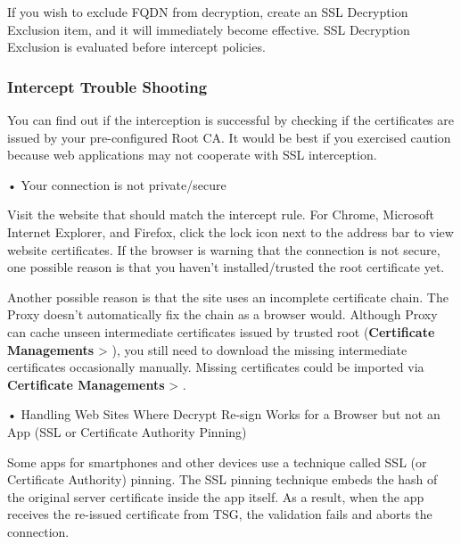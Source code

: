 If you wish to exclude FQDN from decryption, create an SSL Decryption Exclusion item, and it will immediately become effective. 
SSL Decryption Exclusion is evaluated before intercept policies.

\subsubsection*{\hypertarget{link:Intercept Trouble Shooting}{Intercept Trouble Shooting}}
\label{sec:policies:security:intercept:troubleshooting}

You can find out if the interception is successful by checking if the certificates are issued by your pre-configured Root CA. 
It would be best if you exercised caution because web applications may not cooperate with SSL interception.


• Your connection is not private/secure


Visit the website that should match the intercept rule. For Chrome, Microsoft Internet Explorer, and Firefox, click the lock icon next to the address bar to view website certificates. 
If the browser is warning that the connection is not secure, one possible reason is that you haven’t installed/trusted the root certificate yet. 


Another possible reason is that the site uses an incomplete certificate chain. The Proxy doesn’t automatically fix the chain as a browser would. 
Although Proxy can cache unseen intermediate certificates issued 
by trusted root (\textbf{Certificate Managements} > \textbf{\hyperlink{link:Cached Intermediate Certificates}{\color{linkblue}{Cached Intermediate Certificates}}}), 
you still need to download the missing intermediate certificates occasionally manually. 
Missing certificates could be imported via \textbf{Certificate Managements} > \textbf{\hyperlink{link:Trusted Certificate Authorities}{\color{linkblue}{Trusted Certificate Authorities}}}.


• Handling Web Sites Where Decrypt Re-sign Works for a Browser but not an App (SSL or Certificate Authority Pinning)


Some apps for smartphones and other devices use a technique called SSL (or Certificate Authority) pinning. 
The SSL pinning technique embeds the hash of the original server certificate inside the app itself. 
As a result, when the app receives the re-issued certificate from TSG, the validation fails and aborts the connection. 


